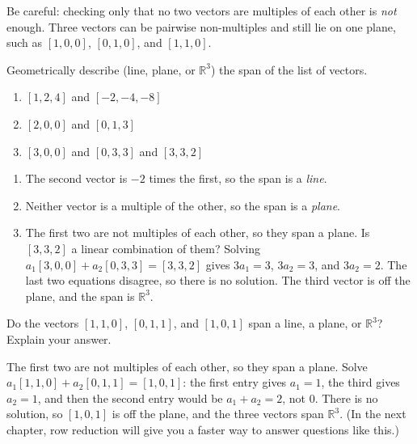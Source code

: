 Be careful: checking only that no two vectors are multiples of each other is
\emph{not} enough. Three vectors can be pairwise non-multiples and still lie on
one plane, such as $[1, 0, 0]$, $[0, 1, 0]$, and $[1, 1, 0]$.

\begin{Exercise}[title = {Determining Span}, label = span1]
Geometrically describe (line, plane, or $\mathbb{R}^3$) the span of the list
of vectors.
\begin{enumerate}
\item $\left[ 1, 2, 4 \right]$ and $\left[-2, -4, -8 \right]$
\item $\left[ 2, 0, 0 \right]$ and $\left[ 0, 1, 3 \right]$
\item $\left[ 3, 0, 0 \right]$ and $\left[ 0, 3, 3 \right]$ and $\left[3, 3, 2 \right]$
\end{enumerate}
\end{Exercise}

\begin{Answer}[ref = span1]
\begin{enumerate}
\item The second vector is $-2$ times the first, so the span is a \textit{line}.
\item Neither vector is a multiple of the other, so the span is a \textit{plane}.
\item The first two are not multiples of each other, so they span a plane. Is
$[3, 3, 2]$ a linear combination of them? Solving
$a_1[3, 0, 0] + a_2[0, 3, 3] = [3, 3, 2]$ gives $3a_1 = 3$, $3a_2 = 3$, and
$3a_2 = 2$. The last two equations disagree, so there is no solution. The third
vector is off the plane, and the span is $\mathbb{R}^3$.
\end{enumerate}
\end{Answer}

\begin{Exercise}[title = {Span of Three Vectors}, label = span2]
Do the vectors $\left[ 1, 1, 0 \right]$, $\left[ 0, 1, 1 \right]$, and $\left[ 1, 0, 1 \right]$ span a line, a plane, or $\mathbb{R}^3$? Explain your answer.
\end{Exercise}

\begin{Answer}[ref = span2]
The first two are not multiples of each other, so they span a plane. Solve
$a_1[1, 1, 0] + a_2[0, 1, 1] = [1, 0, 1]$: the first entry gives $a_1 = 1$, the
third gives $a_2 = 1$, and then the second entry would be $a_1 + a_2 = 2$, not $0$.
There is no solution, so $[1, 0, 1]$ is off the plane, and the three vectors span
$\mathbb{R}^3$. (In the next chapter, row reduction will give you a faster way to
answer questions like this.)
\end{Answer}

